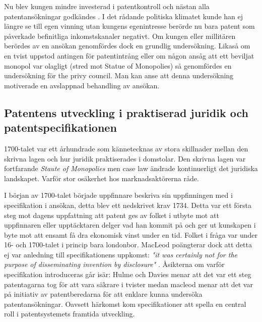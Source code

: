 Nu blev kungen mindre investerad i patentkontroll och nästan alla
patentansökningar godkändes \cite{bracha}. I det rådande politiska klimatet kunde han ej längre se till
egen vinning utan kungens egenintresse berörde nu bara patent som påverkade befinitliga inkomstskanaler
negativt\cite{macleod2}. Om kungen eller millitären berördes av en ansökan genomfördes dock en grundlig
undersökning. Likaså om en tvist uppstod antingen för patentintrång eller om någon ansåg att ett beviljat
monopol var olagligt (stred mot Statue of Monopolies) så genomfördes en undersökning för the privy
council\cite{bracha}. Man kan anse att denna undersökning motiverade en avslappnad behandling av ansökan.

\subsection{Patentens utveckling i praktiserad juridik och patentspecifikationen}

1700-talet var ett århundrade som kännetecknas av stora skillnader mellan den skrivna lagen och hur juridik praktiserades i domstolar. Den skrivna lagen var fortfarande \emph{Staute of Monopolies} men case law ändrade kontinuerligt det juridiska landskapet. Varför stor osäkerhet hos marknadsaktörerna råde.

I början av 1700-talet började uppfinnare beskriva sin uppfinningen med i specifikation i ansökan, detta blev ett nedskrivet krav 1734\cite{macleod}. 
Detta var ett första steg mot dagens uppfattning att patent ges av folket i utbyte mot att uppfinnaren eller
upptäcktaren delger vad han kommit på och ger ut kunskapen i byte mot att ensamt få dra ekonomisk vinst
under en tid. Folket i fråga var under 16- och 1700-talet i princip bara londonbor. MacLeod poängterar dock att detta ej var anledning till specifikationens uppkomst: \emph{"it was certainly not for the purpose of disseminating invention by disclosure"} \cite{macleod2}. Åsikterna om varför specifikation introduceras går isär: Hulme och Davies menar att det var ett steg patentagarna tog för att vara säkrare i tvister medan macleod menar att det var på initiativ av patentberedarna för att enklare kunna undersöka patentansökningar. Oavsett härkomst kom specifikationer att spella en central roll i patentsystemets framtida utveckling.

